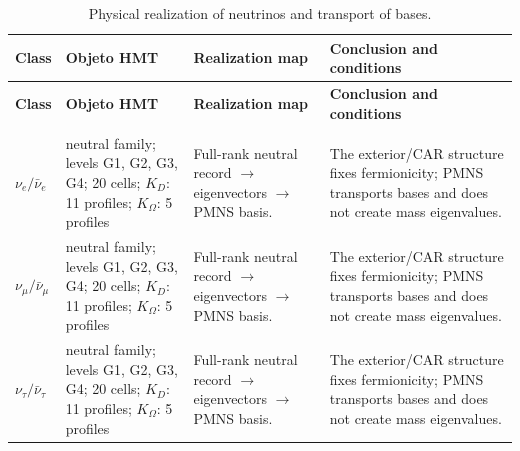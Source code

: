 \begingroup
\setlength{\tabcolsep}{4.5pt}
\renewcommand{\arraystretch}{1.28}
\begin{longtable}{@{}>{\raggedright\arraybackslash}p{}>{\raggedright\arraybackslash}p{}>{\raggedright\arraybackslash}p{}>{\raggedright\arraybackslash}p{}@{}}
\caption{Physical realization of neutrinos and transport of bases.}\label{tab:masas-realizacion-neutrinos}\\
\toprule
\textbf{Class} & \textbf{Objeto HMT} & \textbf{Realization map} & \textbf{Conclusion and conditions} \\
\midrule
\endfirsthead
\toprule
\textbf{Class} & \textbf{Objeto HMT} & \textbf{Realization map} & \textbf{Conclusion and conditions} \\
\midrule
\endhead
\midrule
\multicolumn{4}{r}{\footnotesize Continues on the following page.}\\
\endfoot
\bottomrule
\endlastfoot
$\nu_e/\bar\nu_e$ & neutral family; levels G1, G2, G3, G4; 20 cells; $K_D$: 11 profiles; $K_\Omega$: 5 profiles & Full-rank neutral record $\to$ eigenvectors $\to$ PMNS basis. & The exterior/CAR structure fixes fermionicity; PMNS transports bases and does not create mass eigenvalues. \\
$\nu_\mu/\bar\nu_\mu$ & neutral family; levels G1, G2, G3, G4; 20 cells; $K_D$: 11 profiles; $K_\Omega$: 5 profiles & Full-rank neutral record $\to$ eigenvectors $\to$ PMNS basis. & The exterior/CAR structure fixes fermionicity; PMNS transports bases and does not create mass eigenvalues. \\
$\nu_\tau/\bar\nu_\tau$ & neutral family; levels G1, G2, G3, G4; 20 cells; $K_D$: 11 profiles; $K_\Omega$: 5 profiles & Full-rank neutral record $\to$ eigenvectors $\to$ PMNS basis. & The exterior/CAR structure fixes fermionicity; PMNS transports bases and does not create mass eigenvalues. \\
\end{longtable}
\endgroup
